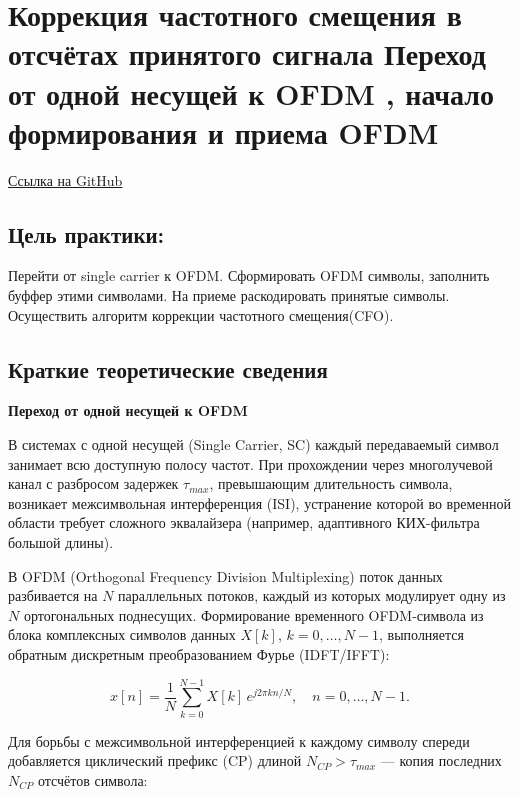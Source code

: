 \chapter[Коррекция частотного смещения в отсчётах принятого сигнала
Переход от одной несущей к OFDM , начало формирования и приема OFDM]{Коррекция частотного смещения в отсчётах принятого сигнала
Переход от одной несущей к OFDM , начало формирования и приема OFDM}

\begin{leftbar}
    \href{https://github.com/someotb/sdr}{Ссылка на GitHub}
\end{leftbar}

\section*{Цель практики:}
Перейти от single carrier к OFDM. Сформировать OFDM символы, заполнить буффер этими символами. На приеме раскодировать принятые символы. Осуществить
алгоритм коррекции частотного смещения(CFO).

\section*{Краткие теоретические сведения}

\textbf{Переход от одной несущей к OFDM}\newline

В системах с одной несущей (Single Carrier, SC) каждый передаваемый символ
занимает всю доступную полосу частот. При прохождении через многолучевой
канал с разбросом задержек $\tau_{max}$, превышающим длительность символа,
возникает межсимвольная интерференция (ISI), устранение которой во временной
области требует сложного эквалайзера (например, адаптивного КИХ-фильтра
большой длины).

В OFDM (Orthogonal Frequency Division Multiplexing) поток данных
разбивается на $N$ параллельных потоков, каждый из которых модулирует одну
из $N$ ортогональных поднесущих. Формирование временного OFDM-символа из
блока комплексных символов данных $X[k]$, $k = 0,\dots,N-1$, выполняется
обратным дискретным преобразованием Фурье (IDFT/IFFT):

\begin{equation}
    x[n] = \frac{1}{N}\sum_{k=0}^{N-1} X[k]\, e^{j2\pi kn/N}, \quad n = 0,\dots,N-1.
\end{equation}

Для борьбы с межсимвольной интерференцией к каждому символу спереди
добавляется циклический префикс (CP) длиной $N_{CP} > \tau_{max}$ —
копия последних $N_{CP}$ отсчётов символа:

